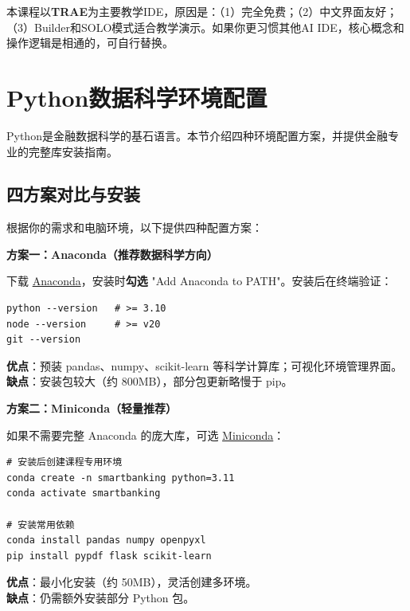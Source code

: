 \begin{practicebox}[本课程推荐方案]
本课程以\textbf{TRAE}为主要教学IDE，原因是：（1）完全免费；（2）中文界面友好；（3）Builder和SOLO模式适合教学演示。如果你更习惯其他AI IDE，核心概念和操作逻辑是相通的，可自行替换。
\end{practicebox}

\section{Python数据科学环境配置}

Python是金融数据科学的基石语言。本节介绍四种环境配置方案，并提供金融专业的完整库安装指南。

\subsection{四方案对比与安装}

根据你的需求和电脑环境，以下提供四种配置方案：

\textbf{方案一：Anaconda（推荐数据科学方向）}

下载 \href{https://www.anaconda.com/download/}{Anaconda}，安装时\textbf{勾选} "Add Anaconda to PATH"。安装后在终端验证：

\begin{lstlisting}[style=shell]
python --version   # >= 3.10
node --version     # >= v20
git --version
\end{lstlisting}

\textbf{优点}：预装 pandas、numpy、scikit-learn 等科学计算库；可视化环境管理界面。\\
\textbf{缺点}：安装包较大（约 800MB），部分包更新略慢于 pip。

\textbf{方案二：Miniconda（轻量推荐）}

如果不需要完整 Anaconda 的庞大库，可选 \href{https://docs.conda.io/en/latest/miniconda.html}{Miniconda}：

\begin{lstlisting}[style=shell]
# 安装后创建课程专用环境
conda create -n smartbanking python=3.11
conda activate smartbanking

# 安装常用依赖
conda install pandas numpy openpyxl
pip install pypdf flask scikit-learn
\end{lstlisting}

\textbf{优点}：最小化安装（约 50MB），灵活创建多环境。\\
\textbf{缺点}：仍需额外安装部分 Python 包。

